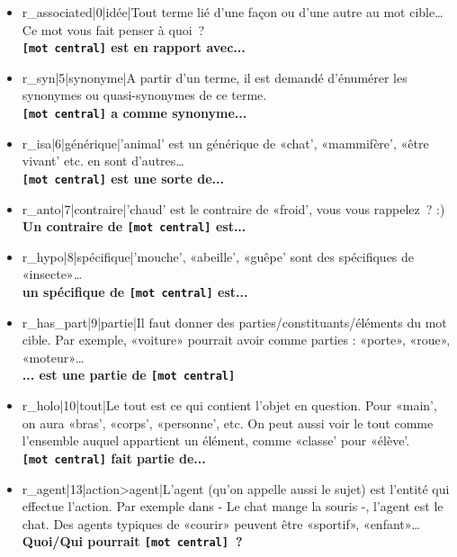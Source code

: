 \documentclass[a4paper,11pt,french]{article}
\begin{document}
\begin{itemize}

\item r\_associated|0|idée|Tout terme lié d'une façon ou d'une autre au mot cible\dots{} Ce mot vous fait penser à quoi~? \\
{\bf \verb![mot central]! est en rapport avec...} \\

\item r\_syn|5|synonyme|A partir d'un terme, il est demandé d'énumérer les synonymes ou quasi-synonymes de ce terme. \\
{\bf \verb![mot central]! a comme synonyme...} \\

\item r\_isa|6|générique|'animal' est un générique de «chat', «mammifère', «être vivant' etc. en sont d'autres\dots{} \\
{\bf \verb![mot central]! est une sorte de...}

\item r\_anto|7|contraire|'chaud' est le contraire de «froid', vous vous rappelez~? :) \\
{\bf Un contraire de \verb![mot central]! est...} \\

\item r\_hypo|8|spécifique|'mouche', «abeille', «guêpe' sont des spécifiques de «insecte»\dots{} \\
{\bf un spécifique de \verb![mot central]! est...} \\

\item r\_has\_part|9|partie|Il faut donner des parties/constituants/éléments du mot cible. Par exemple, «voiture» pourrait avoir comme parties : «porte», «roue», «moteur»\dots{} \\
{\bf ... est une partie de \verb![mot central]!} \\

\item r\_holo|10|tout|Le tout est ce qui contient l'objet en question. Pour «main', on aura «bras', «corps', «personne', etc. On peut aussi voir le tout comme l'ensemble auquel appartient un élément, comme «classe' pour «élève'. \\
{\bf \verb![mot central]! fait partie de...} \\

\item r\_agent|13|action>agent|L'agent (qu'on appelle aussi le sujet) est l'entité qui effectue l'action. Par exemple dans - Le chat mange la souris -, l'agent est le chat. Des agents typiques de «courir» peuvent être «sportif», «enfant»\dots{} \\
{\bf Quoi/Qui pourrait \verb![mot central]!~?} \\


\end{itemize}
\end{document}

